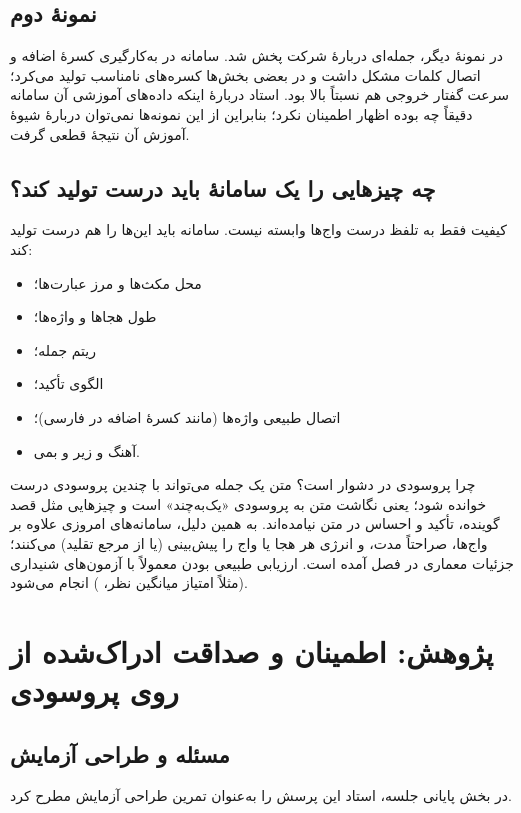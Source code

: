 \subsection{نمونهٔ دوم}
در نمونهٔ دیگر، جمله‌ای دربارهٔ شرکت  پخش شد. سامانه در به‌کارگیری کسرهٔ اضافه و اتصال کلمات مشکل داشت و در بعضی بخش‌ها کسره‌های نامناسب تولید می‌کرد؛ سرعت گفتار خروجی هم نسبتاً بالا بود. استاد دربارهٔ اینکه داده‌های آموزشی آن سامانه دقیقاً چه بوده اظهار اطمینان نکرد؛ بنابراین از این نمونه‌ها نمی‌توان دربارهٔ شیوهٔ آموزش آن نتیجهٔ قطعی گرفت.

\subsection{چه چیزهایی را یک سامانهٔ  باید درست تولید کند؟}
کیفیت  فقط به تلفظ درست واج‌ها وابسته نیست. سامانه باید این‌ها را هم درست تولید کند:
\begin{itemize}
  \item محل مکث‌ها و مرز عبارت‌ها؛
  \item طول هجاها و واژه‌ها؛
  \item ریتم جمله؛
  \item الگوی تأکید؛
  \item اتصال طبیعی واژه‌ها (مانند کسرهٔ اضافه در فارسی)؛
  \item آهنگ و زیر و بمی.
\end{itemize}

\begin{addedbox}{چرا پروسودی در  دشوار است؟}
متن یک جمله می‌تواند با چندین پروسودی درست خوانده شود؛ یعنی نگاشت متن به پروسودی «یک‌به‌چند» است و چیزهایی مثل قصد گوینده، تأکید و احساس در متن نیامده‌اند. به همین دلیل، سامانه‌های  امروزی علاوه بر واج‌ها، صراحتاً مدت،  و انرژی هر هجا یا واج را پیش‌بینی (یا از مرجع تقلید) می‌کنند؛ جزئیات معماری در فصل  آمده است. ارزیابی طبیعی بودن معمولاً با آزمون‌های شنیداری (مثلاً امتیاز میانگین نظر، ) انجام می‌شود.
\end{addedbox}

\section{پژوهش: اطمینان و صداقت ادراک‌شده از روی پروسودی}

\subsection{مسئله و طراحی آزمایش}
در بخش پایانی جلسه، استاد این پرسش را به‌عنوان تمرین طراحی آزمایش مطرح کرد.

